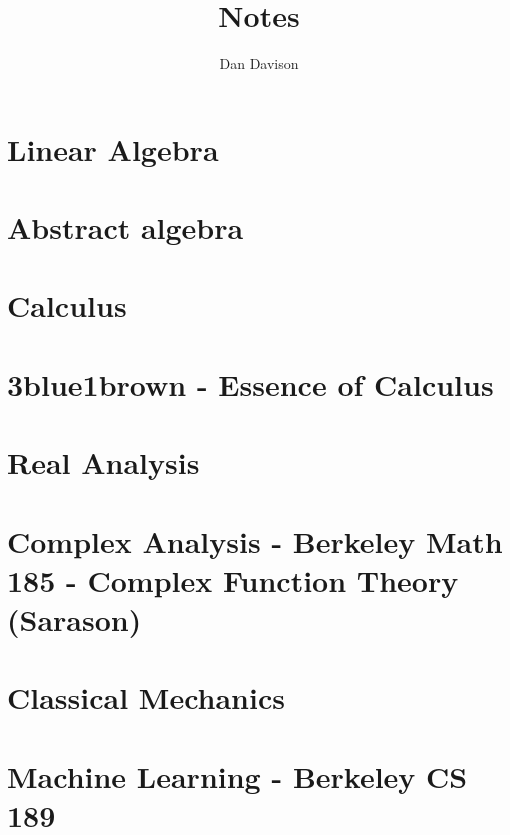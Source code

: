 \documentclass{book}
\title{Notes}
\author{Dan Davison}
\begin{document}
\frontmatter
\maketitle
\tableofcontents
\mainmatter

\chapter{Linear Algebra}


\chapter{Abstract algebra}


\chapter{Calculus}


\chapter{3blue1brown - Essence of Calculus}


\chapter{Real Analysis}


\chapter{Complex Analysis - Berkeley Math 185 - Complex Function Theory (Sarason)}


\chapter{Classical Mechanics}


\chapter{Machine Learning - Berkeley CS 189}


\end{document}

